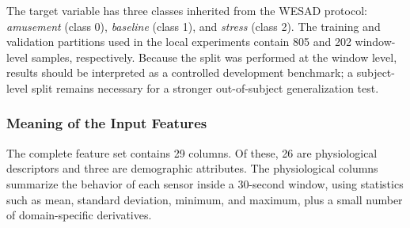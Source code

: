 \documentclass[12pt]{article}
\begin{document}
The target variable has three classes inherited from the WESAD protocol: \textit{amusement} (class 0), \textit{baseline} (class 1), and \textit{stress} (class 2). The training and validation partitions used in the local experiments contain 805 and 202 window-level samples, respectively. Because the split was performed at the window level, results should be interpreted as a controlled development benchmark; a subject-level split remains necessary for a stronger out-of-subject generalization test.

\subsubsection{Meaning of the Input Features}

The complete feature set contains 29 columns. Of these, 26 are physiological descriptors and three are demographic attributes. The physiological columns summarize the behavior of each sensor inside a 30-second window, using statistics such as mean, standard deviation, minimum, and maximum, plus a small number of domain-specific derivatives.

\begin{table}[H]
\centering
\caption{Feature groups used in the WESAD tabular training pipeline.}
\label{tab:wesad_features}
\end{table}
\end{document}
